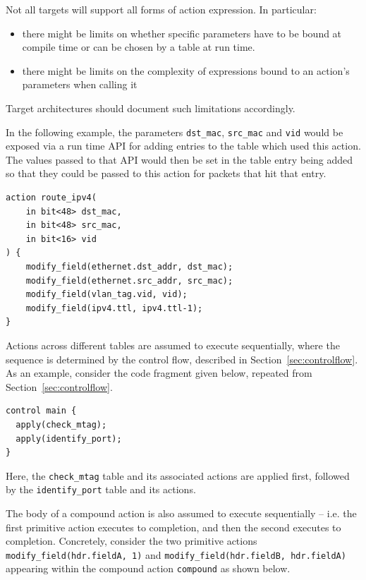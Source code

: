 \documentclass[12pt]{article}
\begin{document}
Not all targets will support all forms of action expression. In particular:
\begin{itemize}
\item
there might be limits on whether specific parameters have to be bound at
compile time or can be chosen by a table at run time.
\item
there might be limits on the complexity of expressions bound to an action's
parameters when calling it
\end{itemize}
Target architectures should document such limitations accordingly.

In the following example, the parameters \texttt{dst_mac}, \texttt{src_mac} 
and \texttt{vid} would be exposed via a run time API for adding entries to the 
table which used this action. The values passed to that API would then be set 
in the table entry being added so that they could be passed to this action for 
packets that hit that entry.

\begin{lstlisting}[style=P4style]
action route_ipv4(
    in bit<48> dst_mac,
    in bit<48> src_mac,
    in bit<16> vid
) {
    modify_field(ethernet.dst_addr, dst_mac);
    modify_field(ethernet.src_addr, src_mac);
    modify_field(vlan_tag.vid, vid);
    modify_field(ipv4.ttl, ipv4.ttl-1);
}
\end{lstlisting}


Actions across different tables are assumed to execute sequentially, where
the sequence is determined by the control flow, described  in
Section~\ref{sec:controlflow}. As an example, consider the code fragment given
below, repeated from Section~\ref{sec:controlflow}.

\begin{lstlisting}[style=P4style]
control main {
  apply(check_mtag);
  apply(identify_port);
}
\end{lstlisting}

Here, the \texttt{check_mtag} table and its associated actions are applied
first, followed by the \texttt{identify_port} table and its actions.

The body of a compound action is also assumed to execute
sequentially -- i.e. the first primitive action executes to completion, and then
the second executes to completion. Concretely, consider the two primitive
actions \texttt{modify_field(hdr.fieldA, 1)} and
\texttt{modify_field(hdr.fieldB, hdr.fieldA)} appearing within the compound
action \texttt{compound} as shown below.
\end{document}
